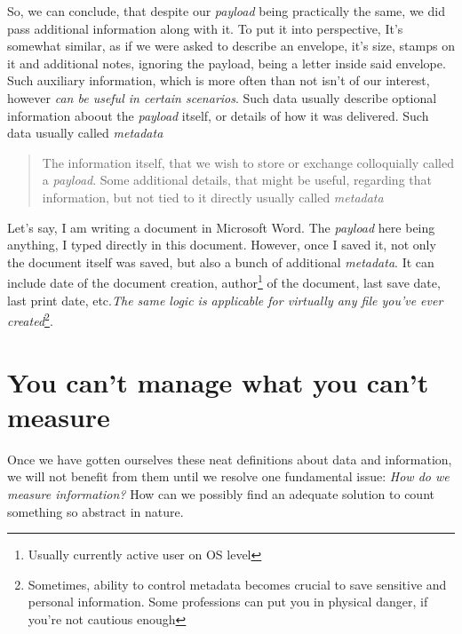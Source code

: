 \documentclass{report}
\begin{document}
            So, we can conclude, that despite our \emph{payload} being practically the same, we did pass additional information along with it. To put it into perspective,
            It's somewhat similar, as if we were asked to describe an envelope, it's size, stamps on it and additional notes, ignoring the payload, being a letter inside
            said envelope. Such auxiliary information, which is more often than not isn't of our interest, however \emph{can be useful in certain scenarios}. Such data
            usually describe optional information aboout the \emph{payload} itself, or details of how it was delivered. Such data usually called \emph{metadata}

            \begin{quote}
                The information itself, that we wish to store or exchange colloquially called a \emph{payload}. Some additional details, that might be useful, regarding
                that information, but not tied to it directly usually called \emph{metadata}
            \end{quote}

            Let's say, I am writing a document in Microsoft Word. The \emph{payload} here being anything, I typed directly in this document. However, once I saved it, not
            only the document itself was saved, but also a bunch of additional \emph{metadata}. It can include date of the document creation, 
            author\footnote{Usually currently active user on OS level} of the document, last save date, last print date, etc.\emph{The same logic is applicable for virtually
            any file you've ever created}\footnote{Sometimes, ability to control metadata becomes crucial to save sensitive and personal information. 
            Some professions can put you in physical danger, if you're not cautious enough}.\par

            \newpage
        \section{You can't manage what you can't measure}
            Once we have gotten ourselves these neat definitions about data and information, we will not benefit from them until we resolve one fundamental issue:
            \emph{How do we measure information?} How can we possibly find an adequate solution to count something so abstract in nature. \par 
\end{document}
